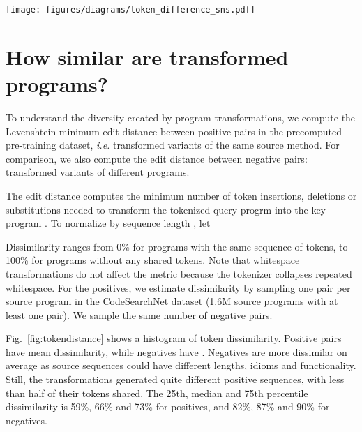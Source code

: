 \documentclass[11pt]{article}
\begin{document}
\begin{figure*}
  \centering
  \texttt{[image: figures/diagrams/token\_difference\_sns.pdf]}
  \caption{Histogram of pairwise token dissimilarity for contrastive positives (transformed variants of the same method) and negatives (transformed variants of different methods). Code transformations produce positives with dissimilar token sequences.}
  \label{fig:tokendistance}
\end{figure*}


 
\section{How similar are transformed programs?}
\label{sec:appendix:dissimilarity}
To understand the diversity created by program transformations, we compute the Levenshtein minimum edit distance between positive pairs in the precomputed pre-training dataset, \textit{i.e.} transformed variants of the same source method. For comparison, we also compute the edit distance between negative pairs: transformed variants of different programs.

The edit distance  computes the minimum number of token insertions, deletions or substitutions needed to transform the tokenized query progrm  into the key program .
 To normalize by sequence length , let 

Dissimilarity ranges from 0\% for programs with the same sequence of tokens, to 100\% for programs without any shared tokens.
Note that whitespace transformations do not affect the metric because the tokenizer collapses repeated whitespace. For the positives, we estimate dissimilarity by sampling one pair per source program in the CodeSearchNet dataset (1.6M source programs with at least one pair). We sample the same number of negative pairs.

Fig.~\ref{fig:tokendistance} shows a histogram of token dissimilarity. Positive pairs have  mean dissimilarity, while negatives have . Negatives are more dissimilar on average as source sequences could have different lengths, idioms and functionality. Still, the transformations generated quite different positive sequences, with less than half of their tokens shared. The 25th, median and 75th percentile dissimilarity is 59\%, 66\% and 73\% for positives, and 82\%, 87\% and 90\% for negatives.
\end{document}

